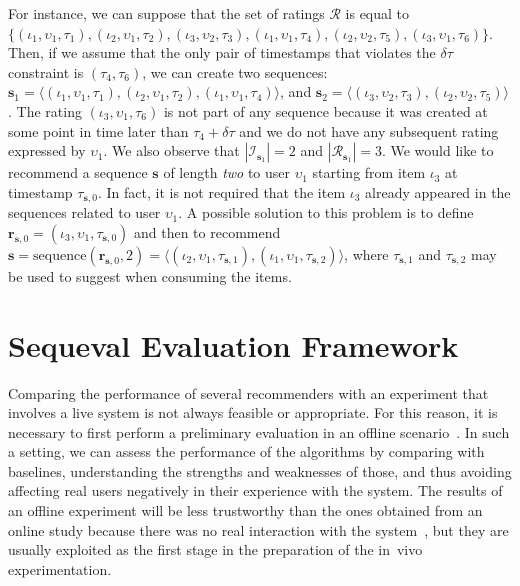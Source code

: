 For instance, we can suppose that the set of ratings $\mathcal{R}$ is equal to $\{(\iota_1, \upsilon_1, \tau_1),\allowbreak (\iota_2, \upsilon_1, \tau_2),\allowbreak (\iota_3, \upsilon_2, \tau_3),\allowbreak (\iota_1, \upsilon_1, \tau_4),\allowbreak (\iota_2, \upsilon_2, \tau_5),\allowbreak (\iota_3, \upsilon_1, \tau_6)\}$. Then, if we assume that the only pair of timestamps that violates the $\delta \tau$ constraint is $(\tau_4, \tau_6)$, we can create two sequences: $\mathbf{s}_1 = \langle (\iota_1, \upsilon_1, \tau_1),\allowbreak (\iota_2, \upsilon_1, \tau_2),\allowbreak (\iota_1, \upsilon_1, \tau_4) \rangle$, and $\mathbf{s}_2 = \langle (\iota_3, \upsilon_2, \tau_3),\allowbreak (\iota_2, \upsilon_2, \tau_5) \rangle$. The rating $(\iota_3, \upsilon_1, \tau_6)$ is not part of any sequence because it was created at some point in time later than $\tau_4 + \delta \tau$ and we do not have any subsequent rating expressed by $\upsilon_1$. We also observe that $|\mathcal{I}_{\mathbf{s}_1}| = 2$ and $|\mathcal{R}_{\mathbf{s}_1}| = 3$. We would like to recommend a sequence $\mathbf{s}$ of length \emph{two} to user $\upsilon_1$ starting from item $\iota_3$ at timestamp $\tau_{\mathbf{s}, 0}$. In fact, it is not required that the item $\iota_3$ already appeared in the sequences related to user $\upsilon_1$. A possible solution to this problem is to define $\mathbf{r}_{\mathbf{s}, 0} = (\iota_3, \upsilon_1, \tau_{\mathbf{s}, 0})$ and then to recommend $\mathbf{s} = \mathrm{sequence}(\mathbf{r}_{\mathbf{s}, 0}, 2) = \langle (\iota_2, \upsilon_1, \tau_{\mathbf{s}, 1}),\allowbreak (\iota_1, \upsilon_1, \tau_{\mathbf{s}, 2}) \rangle$, where $\tau_{\mathbf{s}, 1}$ and $\tau_{\mathbf{s}, 2}$ may be used to suggest when consuming the items.

\section{Sequeval Evaluation Framework}
\label{seq:sec:sequeval}

Comparing the performance of several recommenders with an experiment that involves a live system is not always feasible or appropriate. For this reason, it is necessary to first perform a preliminary evaluation in an offline scenario~\cite{Gunawardana2015}. In such a setting, we can assess the performance of the algorithms by comparing with baselines, understanding the strengths and weaknesses of those, and thus avoiding affecting real users negatively in their experience with the system. The results of an offline experiment will be less trustworthy than the ones obtained from an online study because there was no real interaction with the system~\cite{Turpin2001}, but they are usually exploited as the first stage in the preparation of the in~vivo experimentation.

